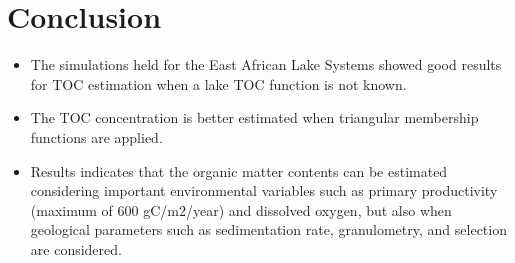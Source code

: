\documentclass[aspectratio=169]{beamer} %
\begin{document}
{{{{{{{{{{{{\begin{frame}
\end{frame}
}
}


\section{Conclusion}

{

{ \begin{frame}
	\vspace{1cm}
	\begin{center}
	\begin{large}
	\color{blue}{Some conclusions}
	\end{large}
	\end{center}

\begin{itemize}
\item The simulations held for the East African Lake Systems
showed good results for TOC estimation when a lake
TOC function is not known.
\pause
\item  The TOC concentration is
better estimated when triangular membership functions
are applied.
\pause
\item  Results indicates that the organic matter
contents can be estimated considering important
environmental variables such as primary productivity
(maximum of 600 gC/m2/year) and dissolved oxygen, but
also when geological parameters such as sedimentation
rate, granulometry, and selection are considered.
\end{itemize}


\end{frame}}}}}}}}}}}}}
\end{document}
